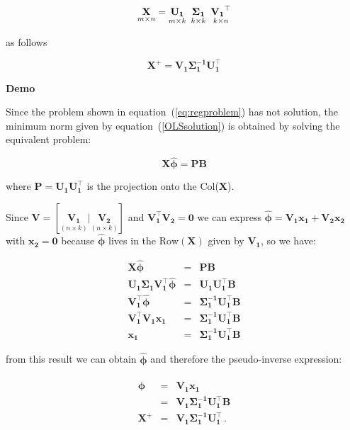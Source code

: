 \begin{equation}
    \label{eq:compactsvd}
    \underset{m \times n}{\mathbf{X}}=
    \underset{m \times k}{\mathbf{U_1}} \enskip
    \underset{k \times k}{\mathbf{\Sigma_1}} \enskip
    \underset{k \times n}{\mathbf{V_1}^\top}
\end{equation}

\noindent as follows

\begin{equation}
\label{eq:pseudoinversesvd}
\mathbf{X}^+ = \mathbf{V_1\Sigma_1^{-1}U_1^\top}
\end{equation}




\textbf{Demo}\quad

Since the problem shown in equation~(\ref{eq:regproblem}) has not
solution, the minimum norm given by equation~(\ref{OLSsolution}) is
obtained by solving the equivalent problem:

\begin{equation*}
\label{eq:proyectorsol}
\mathbf{X \hat{\phi} = PB} 
\end{equation*}

\noindent where $\mathbf{P=U_1 U_1^\top}$ is the projection onto the
Col($\mathbf{X}$). 

Since $\mathbf{V} = [\underset{(n \times k)}{\mathbf{V_1}} |
\underset{(n \times k)}{\mathbf{V_2}}]$ and $\mathbf{V_1^\top V_2 =
0}$ we can express $\mathbf{\hat{\phi}} = \mathbf{V_1 x_1 + V_2 x_2}$
with $\mathbf{x_2=0}$ because $\mathbf{\hat{\phi}}$ lives in the
$\text{Row}(\mathbf{X})$ given by $\mathbf{V_1}$, so we have:

\begin{eqnarray*}
\mathbf{X \hat{\phi}} &=& \mathbf{PB} \\
\mathbf{U_1 \Sigma_1 V_1^\top \hat{\phi}} &=& \mathbf{U_1 U_1^\top B} \\
\mathbf{ V_1^\top \hat{\phi}} &=&  \mathbf{\Sigma_1^{-1} U_1^\top B} \\ 
\mathbf{ V_1^\top V_1 x_1} &=& \mathbf{\Sigma_1^{-1}
U_1^\top B} \\
\mathbf{x_1}&=& \mathbf{\Sigma_1^{-1} U_1^\top B}
\end{eqnarray*}

\noindent from this result we can obtain $\mathbf{\hat{\phi}}$ and
therefore the pseudo-inverse expression:

\begin{eqnarray*}
\mathbf{\hat{\phi}} &=& \mathbf{V_1 x_1} \\
                &=& \mathbf{V_1 \Sigma_1^{-1} U_1^\top B} \\
\mathbf{X^+} &=& \mathbf{V_1 \Sigma_1^{-1} U_1^\top} \, .
\end{eqnarray*}



